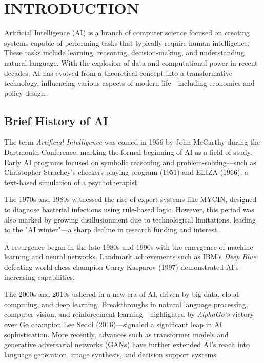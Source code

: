 \chapter{\uppercase{Introduction}}
\justifying
\label{chap:introduction}

Artificial Intelligence (AI) is a branch of computer science focused on creating systems capable of performing tasks that typically require human intelligence. These tasks include learning, reasoning, decision-making, and understanding natural language. With the explosion of data and computational power in recent decades, AI has evolved from a theoretical concept into a transformative technology, influencing various aspects of modern life—including economics and policy design. \citep{googleai-overview}

\section{Brief History of AI}
\label{sec:history-of-ai}

The term \textit{Artificial Intelligence} was coined in 1956 by John McCarthy during the Dartmouth Conference, marking the formal beginning of AI as a field of study. Early AI programs focused on symbolic reasoning and problem-solving—such as Christopher Strachey’s checkers-playing program (1951) and ELIZA (1966), a text-based simulation of a psychotherapist.

The 1970s and 1980s witnessed the rise of expert systems like MYCIN, designed to diagnose bacterial infections using rule-based logic. However, this period was also marked by growing disillusionment due to technological limitations, leading to the "AI winter"—a sharp decline in research funding and interest.

A resurgence began in the late 1980s and 1990s with the emergence of machine learning and neural networks. Landmark achievements such as IBM’s \textit{Deep Blue} defeating world chess champion Garry Kasparov (1997) demonstrated AI’s increasing capabilities.

The 2000s and 2010s ushered in a new era of AI, driven by big data, cloud computing, and deep learning. Breakthroughs in natural language processing, computer vision, and reinforcement learning—highlighted by \textit{AlphaGo’s} victory over Go champion Lee Sedol (2016)—signaled a significant leap in AI sophistication. More recently, advances such as transformer models and generative adversarial networks (GANs) have further extended AI’s reach into language generation, image synthesis, and decision support systems. \citep{tableauhistory}

